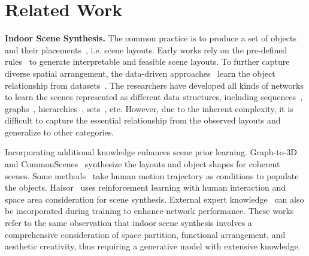 \section{Related Work}

\noindent \textbf{Indoor Scene Synthesis.} The common practice is to produce a set of objects and their placements~\cite{Patil2023AdvancesID}, i.e. scene layouts. Early works rely on the pre-defined rules~\cite{Yu2011MakeIH, Merrell2011InteractiveFL, Ma2016Actiondriven3I, Fu2017AdaptiveSO, Fu2020HumancentricMF} to generate interpretable and feasible scene layouts. To further capture diverse spatial arrangement, the data-driven approaches~\cite{fisher2012example, Qi2018HumanCentricIS, xu2014organizing, ma2018language, Sun2022SequentialFO, Sun2024SequentialSA} learn the object relationship from datasets~\cite{fu20213d, song2017semantic}. The researchers have developed all kinds of networks to learn the scenes represented as different data structures, including sequences~\cite{Wang2018DeepCP}, graphs~\cite{Zhou2019SceneGraphNetNM, Wang2019PlanITPA}, hierarchies~\cite{li2019grains, Gao2023SceneHGNHG}, sets~\cite{Paschalidou2021ATISSAT, Wei2023LEGONetLR, Tang2023DiffuSceneSG, zhai2024echoscene}, etc. However, due to the inherent complexity, it is difficult to capture the essential relationship from the observed layouts and generalize to other categories.



Incorporating additional knowledge enhances scene prior learning.  Graph-to-3D~\cite{Dhamo2021Graphto3DEG} and CommonScenes~\cite{zhai2024commonscenes} synthesize the layouts and object shapes for coherent scenes. Some methods~\cite{ye2022scene, yi2023mime} take human motion trajectory as conditions to populate the objects. Haisor~\cite{sun2024haisor} uses reinforcement learning with human interaction and space area consideration for scene synthesis. External expert knowledge~\cite{leimer2022layoutenhancer, yang2024learning} can also be incorporated during training to enhance network performance. These works refer to the same observation that indoor scene synthesis involves a comprehensive consideration of space partition, functional arrangement, and aesthetic creativity, thus requiring a generative model with extensive knowledge.


